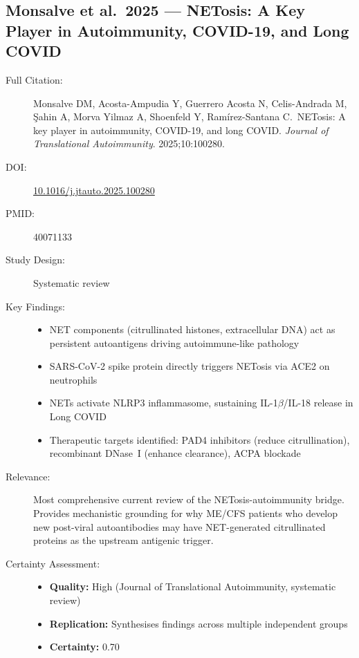 \subsection{Monsalve et al.\ 2025 --- NETosis: A Key Player in Autoimmunity, COVID-19, and Long COVID}

\begin{description}
    \item[Full Citation:] Monsalve DM, Acosta-Ampudia Y, Guerrero Acosta N, Celis-Andrada M, \c{S}ahin A, Morva Yilmaz A, Shoenfeld Y, Ram\'irez-Santana C.\ NETosis: A key player in autoimmunity, COVID-19, and long COVID. \textit{Journal of Translational Autoimmunity}. 2025;10:100280. \cite{Monsalve2025}
    \item[DOI:] \href{https://doi.org/10.1016/j.jtauto.2025.100280}{10.1016/j.jtauto.2025.100280}
    \item[PMID:] 40071133
    \item[Study Design:] Systematic review
    \item[Key Findings:]
    \begin{itemize}
        \item NET components (citrullinated histones, extracellular DNA) act as persistent autoantigens driving autoimmune-like pathology
        \item SARS-CoV-2 spike protein directly triggers NETosis via ACE2 on neutrophils
        \item NETs activate NLRP3 inflammasome, sustaining IL-1$\beta$/IL-18 release in Long COVID
        \item Therapeutic targets identified: PAD4 inhibitors (reduce citrullination), recombinant DNase~I (enhance clearance), ACPA blockade
    \end{itemize}
    \item[Relevance:] Most comprehensive current review of the NETosis-autoimmunity bridge. Provides mechanistic grounding for why ME/CFS patients who develop new post-viral autoantibodies may have NET-generated citrullinated proteins as the upstream antigenic trigger.
    \item[Certainty Assessment:]
    \begin{itemize}
        \item \textbf{Quality:} High (Journal of Translational Autoimmunity, systematic review)
        \item \textbf{Replication:} Synthesises findings across multiple independent groups
        \item \textbf{Certainty:} 0.70
    \end{itemize}
\end{description}

